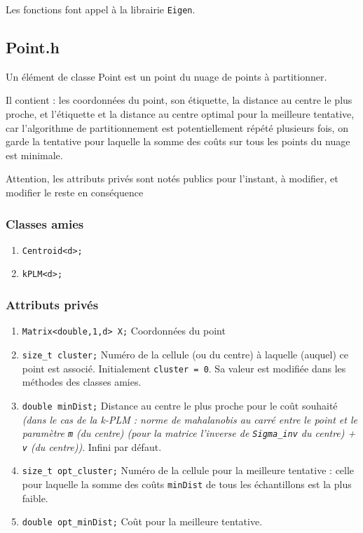 \documentclass[10pt,a4paper,notitlepage]{article}
\begin{document}
Les fonctions font appel à la librairie \texttt{Eigen}.



\subsection{Point.h}

Un élément de classe Point est un point du nuage de points à partitionner.

Il contient : les coordonnées du point, son étiquette, la distance au centre le plus proche, et l'étiquette et la distance au centre optimal pour la meilleure tentative, car l'algorithme de partitionnement est potentiellement répété plusieurs fois, on garde la tentative pour laquelle la somme des coûts sur tous les points du nuage est minimale.


{\color{red} Attention, les attributs privés sont notés publics pour l'instant, à modifier, et modifier le reste en conséquence}
\subsubsection{Classes amies}
\begin{enumerate}
\item \texttt{Centroid<d>;}
\item \texttt{kPLM<d>;}
\end{enumerate}
\subsubsection{Attributs privés}
\begin{enumerate}
\item \texttt{Matrix<double,1,d> X;} Coordonnées du point
\item \texttt{size\_t cluster;} Numéro de la cellule (ou du centre) à laquelle (auquel) ce point est associé. Initialement \texttt{cluster = 0}. Sa valeur est modifiée dans les méthodes des classes amies.
\item \texttt{double minDist;} Distance au centre le plus proche pour le coût souhaité \textit{(dans le cas de la k-PLM : norme de mahalanobis au carré entre le point et le paramètre \texttt{m} (du centre) (pour la matrice l'inverse de \texttt{Sigma\_inv} du centre) + \texttt{v} (du centre))}. Infini par défaut.
\item \texttt{size\_t opt\_cluster;} Numéro de la cellule pour la meilleure tentative : celle pour laquelle la somme des coûts  \texttt{minDist} de tous les échantillons est la plus faible.
\item \texttt{double opt\_minDist;} Coût pour la meilleure tentative.
\end{enumerate}
\end{document}
